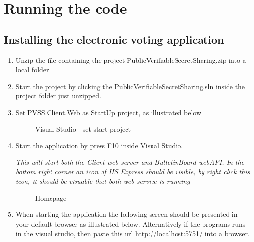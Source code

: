 \section{Running the code}
\label{sec:running_the_code}

\subsection{Installing the electronic voting application}




\begin{enumerate}
    \item Unzip the file containing the project PublicVerifiableSecretSharing.zip into a local folder
    
    \item Start the project by clicking the PublicVerifiableSecretSharing.sln inside the
    project folder just unzipped. 
    
    \item Set PVSS.Client.Web as StartUp project, as illustrated below 

    \begin{figure}[H]
        \centering
        \caption{Visual Studio - set start project}
    \end{figure}     
    
    \item Start the application by press F10 inside Visual Studio. 
    
    \textit{This will start both the Client web server and BulletinBoard webAPI. In the bottom right corner an icon of IIS Express should be visible, by right click this icon, it should be visuable that both web service is running }
    
    \begin{figure}[H]
        \centering
        \caption{Homepage}
    \end{figure}     
    
    \item When starting the application the following screen should be presented in your default browser as illustrated below. Alternatively if the programs runs in the visual studio, then paste this url http://localhost:5751/ into a browser. 
    

\end{enumerate}

